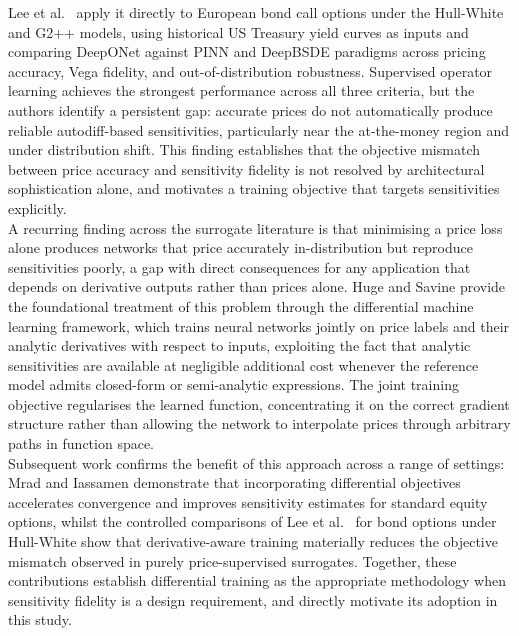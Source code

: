   \noindent
  Lee et al.\ \cite{lee2026deeponet} apply it directly to European bond call
  options under the Hull-White and G2++ models, using historical US Treasury yield curves as inputs and comparing DeepONet against PINN and DeepBSDE paradigms across pricing accuracy, Vega
  fidelity, and out-of-distribution robustness. Supervised operator learning achieves the strongest performance across all three criteria, but the authors identify a persistent gap: accurate prices do not automatically produce reliable autodiff-based sensitivities, particularly near the at-the-money region and under distribution shift. This finding establishes that the
  objective mismatch between price accuracy and sensitivity fidelity is not resolved by architectural sophistication alone, and motivates a training objective that targets sensitivities
  explicitly. \\

  \noindent
    A recurring finding across the surrogate literature is that minimising a price loss alone produces networks that price accurately in-distribution but reproduce sensitivities poorly, a gap with direct consequences for any application that depends on derivative outputs rather than prices alone. Huge and Savine \cite{huge2020differential} provide the foundational treatment of this problem through the differential machine learning framework, which trains neural networks jointly on price labels and their analytic derivatives with respect to inputs, exploiting the fact that analytic sensitivities are available at negligible additional cost whenever the reference model admits closed-form or semi-analytic expressions. The joint training objective regularises the learned function, concentrating it on the correct gradient structure rather than allowing the network to interpolate prices through arbitrary paths in function space. \\

    \noindent
    Subsequent work confirms the benefit of this approach across a range of settings: Mrad and Iassamen \cite{mrad2025differential} demonstrate that incorporating differential objectives accelerates convergence and improves sensitivity estimates for standard equity options, whilst the controlled comparisons of Lee et al.\ \cite{lee2026deeponet} for bond options under Hull-White show that derivative-aware training materially reduces the objective mismatch observed in purely price-supervised surrogates. Together, these contributions establish differential training as the appropriate methodology when sensitivity fidelity is a design requirement, and directly motivate its adoption in this study. \\


